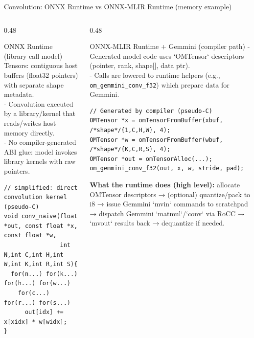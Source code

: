 \documentclass[aspectratio=169,10pt]{beamer}
\newcommand{\code}[1]{\texttt{\footnotesize #1}}
\begin{document}
\begin{frame}{Convolution: ONNX Runtime vs ONNX-MLIR Runtime (memory example)}
  \scriptsize
  \begin{columns}[T,onlytextwidth]
    \begin{column}{0.48\textwidth}
      \begin{block}{ONNX Runtime (library-call model)}
        - Tensors: contiguous host buffers (float32 pointers) with separate shape metadata.\\
        - Convolution executed by a library/kernel that reads/writes host memory directly.\\
        - No compiler-generated ABI glue: model invokes library kernels with raw pointers.
      \end{block}

      \begin{lstlisting}
// simplified: direct convolution kernel (pseudo-C)
void conv_naive(float *out, const float *x, const float *w,
                int N,int C,int H,int W,int K,int R,int S){
  for(n...) for(k...) for(h...) for(w...)
    for(c...) for(r...) for(s...)
      out[idx] += x[xidx] * w[widx];
}
      \end{lstlisting}
    \end{column}

    \begin{column}{0.48\textwidth}
      \begin{block}{ONNX-MLIR Runtime + Gemmini (compiler path)}
        - Generated model code uses `OMTensor` descriptors (pointer, rank, shape[], data ptr).\\
        - Calls are lowered to runtime helpers (e.g., \code{om_gemmini_conv_f32}) which prepare data for Gemmini.
      \end{block}

      \begin{lstlisting}
// Generated by compiler (pseudo-C)
OMTensor *x = omTensorFromBuffer(xbuf, /*shape*/{1,C,H,W}, 4);
OMTensor *w = omTensorFromBuffer(wbuf, /*shape*/{K,C,R,S}, 4);
OMTensor *out = omTensorAlloc(...);
om_gemmini_conv_f32(out, x, w, stride, pad);
      \end{lstlisting}

      \vspace{0.4em}
      {\tiny \textbf{What the runtime does (high level):} allocate OMTensor descriptors → (optional) quantize/pack to i8 → issue Gemmini `mvin` commands to scratchpad → dispatch Gemmini `matmul`/`conv` via RoCC → `mvout` results back → dequantize if needed.}
    \end{column}
  \end{columns}
\end{frame}
\end{document}
